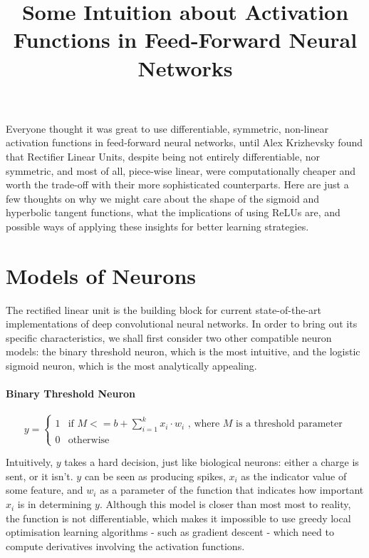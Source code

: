 \documentclass[a4paper,11pt]{article}
\title{Some Intuition about Activation Functions in Feed-Forward Neural Networks}
\begin{document}
\maketitle

\abstract
{
Everyone thought it was great to use differentiable, symmetric, non-linear activation functions in feed-forward neural networks, until Alex Krizhevsky \cite{krizhevsky} found that Rectifier Linear Units, despite being not entirely differentiable, nor symmetric, and most of all, piece-wise linear, were computationally cheaper and worth the trade-off with their more sophisticated counterparts. Here are just a few thoughts on why we might care about the shape of the sigmoid and hyperbolic tangent functions, what the implications of using ReLUs are, and possible ways of applying these insights for better learning strategies.
}

\clearpage

\section{Models of Neurons}

The rectified linear unit is the building block for current state-of-the-art implementations of deep convolutional neural networks. In order to bring out its specific characteristics, we shall first consider two other compatible neuron models: the binary threshold neuron, which is the most intuitive, and the logistic sigmoid neuron, which is the most analytically appealing. \\

\paragraph{Binary Threshold Neuron}
\begin{equation}
y = \begin{cases} 1 & \mbox{if } M <= b + \sum\limits_{i=1}^k x_{i}\cdot w_{i}  \text{ , where } M \text{ is a threshold parameter} \\ 
				  0 & \mbox{otherwise} \end{cases}
\end{equation}

Intuitively, $y$ takes a hard decision, just like biological neurons: either a charge is sent, or it isn't. $y$ can be seen as producing spikes, $x_i$ as the indicator value of some feature, and $w_i$ as a parameter of the function that indicates how important $x_i$ is in determining $y$. Although this model is closer than most most to reality, the function is not differentiable, which makes it impossible to use greedy local optimisation learning algorithms - such as gradient descent - which need to compute derivatives involving the activation functions.
\end{document}
